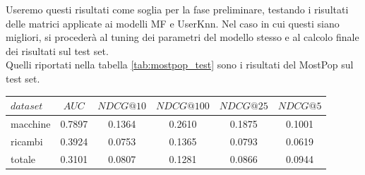 Useremo questi risultati come soglia per la fase preliminare, testando i risultati delle matrici applicate ai modelli MF e UserKnn. Nel caso in cui questi siano migliori, si procederà al tuning dei parametri del modello stesso e al calcolo finale dei risultati sul test set.\\
Quelli riportati nella tabella \ref{tab:mostpop_test} sono i risultati del MostPop sul test set.\\
\begin{center}
\begin{tabular}{|l|c|cccc|}
    \toprule
    $dataset$ &    $AUC$ &  $NDCG@10$ & $NDCG@100$  & $NDCG@25$ & $NDCG@5$  \\
    \midrule
    macchine & 0.7897 &  0.1364 &   0.2610 &  0.1875 & 0.1001 \\
    ricambi  & 0.3924 &  0.0753 &   0.1365 &  0.0793 & 0.0619 \\
    totale  & 0.3101 &  0.0807 &   0.1281 &  0.0866 & 0.0944 \\

\bottomrule
\end{tabular}
\label{tab:mostpop_test}
\end{center}

